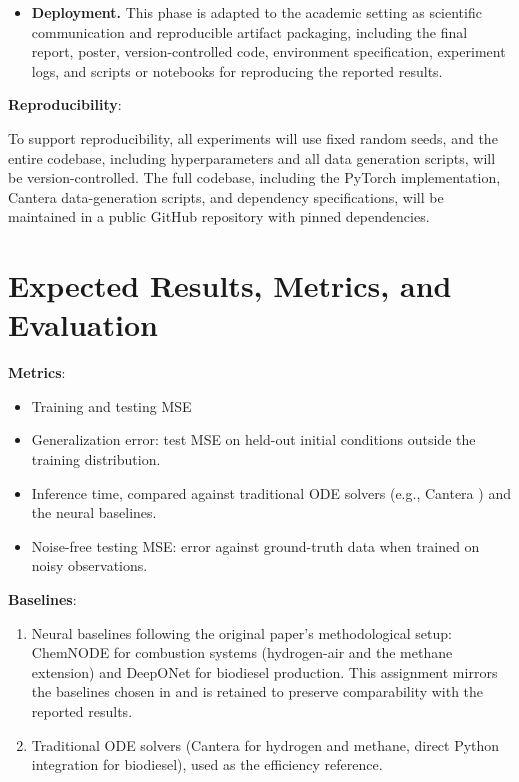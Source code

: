 \documentclass[11pt,a4paper]{article}
\begin{document}
\begin{itemize}
    \item \textbf{Deployment.}
    This phase is adapted to the academic setting as scientific communication and reproducible artifact packaging, including the final report, poster, version-controlled code, environment specification, experiment logs, and scripts or notebooks for reproducing the reported results.
\end{itemize}

\noindent\textbf{Reproducibility}:

\noindent To support reproducibility, all experiments will use fixed random seeds, and the entire codebase, including hyperparameters and all data generation scripts, will be version-controlled. The full codebase, including the PyTorch implementation, Cantera \cite{cantera} data-generation scripts, and dependency specifications, will be maintained in a public GitHub repository with pinned dependencies.

\section*{Expected Results, Metrics, and Evaluation}

\noindent\textbf{Metrics}:
\begin{itemize}
  \item Training and testing MSE
  \item Generalization error: test MSE on held-out initial conditions outside the training distribution.
  \item Inference time, compared against traditional ODE solvers (e.g., Cantera \cite{cantera}) and the neural baselines.
  \item Noise-free testing MSE: error against ground-truth data when trained on noisy observations.
\end{itemize}

\noindent\textbf{Baselines}: 
\begin{enumerate}
    \item Neural baselines following the original paper's methodological setup: ChemNODE \cite{OWOYELE2022100118} for combustion systems (hydrogen-air and the methane extension) and DeepONet \cite{lu2019deeponet} for biodiesel production. This assignment mirrors the baselines chosen in \cite{Koenig_2025} and is retained to preserve comparability with the reported results.
    \item Traditional ODE solvers (Cantera \cite{cantera} for hydrogen and methane, direct Python integration for biodiesel), used as the efficiency reference.
\end{enumerate}
\end{document}

